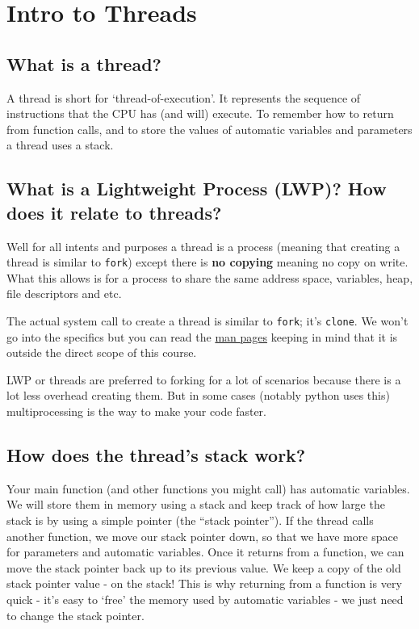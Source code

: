 \section{Intro to Threads}\label{intro-to-threads}

\subsection{What is a thread?}\label{what-is-a-thread}

A thread is short for `thread-of-execution'. It represents the sequence
of instructions that the CPU has (and will) execute. To remember how to
return from function calls, and to store the values of automatic
variables and parameters a thread uses a stack.

\subsection{What is a Lightweight Process (LWP)? How does it relate to
threads?}\label{what-is-a-lightweight-process-lwp-how-does-it-relate-to-threads}

Well for all intents and purposes a thread is a process (meaning that
creating a thread is similar to \texttt{fork}) except there is
\textbf{no copying} meaning no copy on write. What this allows is for a
process to share the same address space, variables, heap, file
descriptors and etc.

The actual system call to create a thread is similar to \texttt{fork};
it's \texttt{clone}. We won't go into the specifics but you can read the
\href{http://man7.org/linux/man-pages/man2/clone.2.html}{man pages}
keeping in mind that it is outside the direct scope of this course.

LWP or threads are preferred to forking for a lot of scenarios because
there is a lot less overhead creating them. But in some cases (notably
python uses this) multiprocessing is the way to make your code faster.

\subsection{How does the thread's stack
work?}\label{how-does-the-threads-stack-work}

Your main function (and other functions you might call) has automatic
variables. We will store them in memory using a stack and keep track of
how large the stack is by using a simple pointer (the ``stack
pointer''). If the thread calls another function, we move our stack
pointer down, so that we have more space for parameters and automatic
variables. Once it returns from a function, we can move the stack
pointer back up to its previous value. We keep a copy of the old stack
pointer value - on the stack! This is why returning from a function is
very quick - it's easy to `free' the memory used by automatic variables
- we just need to change the stack pointer.

